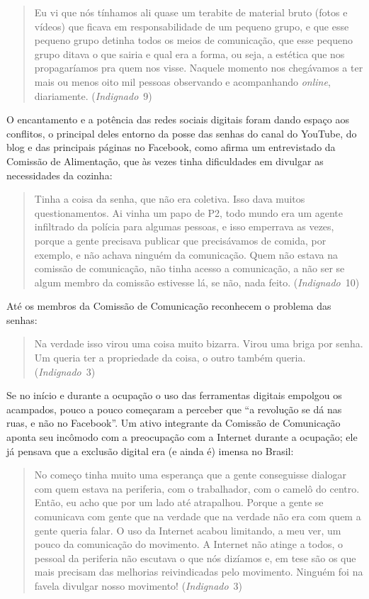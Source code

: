 \begin{quote}
Eu vi que nós tínhamos ali quase um terabite de material bruto
(fotos e vídeos) que ficava em responsabilidade de um pequeno
grupo, e que esse pequeno grupo detinha todos os meios de comunicação,
que esse pequeno grupo ditava o que sairia e qual era a forma, ou seja,
a estética que nos propagaríamos pra quem nos visse. Naquele momento nos
chegávamos a ter mais ou menos oito mil pessoas observando e
acompanhando \textit{online}, diariamente. (\textit{Indignado}~9)
\end{quote}

O encantamento e a potência das redes sociais digitais foram dando
espaço aos conflitos, o principal deles entorno da posse das senhas do
canal do YouTube, do blog e das principais páginas no Facebook, como
afirma um entrevistado da Comissão de Alimentação, que às vezes tinha
dificuldades em divulgar as necessidades da cozinha:

\begin{quote}
Tinha a coisa da senha, que não era coletiva. Isso dava muitos
questionamentos. Ai vinha um papo de P2, todo mundo era um agente
infiltrado da polícia para algumas pessoas, e isso emperrava as vezes,
porque a gente precisava publicar que precisávamos de comida, por
exemplo, e não achava ninguém da comunicação. Quem não estava na
comissão de comunicação, não tinha acesso a comunicação, a não ser se
algum membro da comissão estivesse lá, se não, nada feito. (\textit{Indignado}~10)
\end{quote}

Até os membros da Comissão de Comunicação reconhecem o problema das
senhas:

\begin{quote}
Na verdade isso virou uma coisa muito bizarra. Virou uma briga por
senha. Um queria ter a propriedade da coisa, o outro também queria.
(\textit{Indignado}~3)
\end{quote}

Se no início e durante a ocupação o uso das ferramentas digitais
empolgou os acampados, pouco a pouco começaram a perceber que ``a
revolução se dá nas ruas, e não no Facebook''. Um ativo integrante da
Comissão de Comunicação aponta seu incômodo com a preocupação com a
Internet durante a ocupação; ele já pensava que a exclusão digital era
(e ainda é) imensa no Brasil:

\begin{quote}
No começo tinha muito uma esperança que a gente conseguisse
dialogar com quem estava na periferia, com o trabalhador, com o camelô
do centro. Então, eu acho que por um lado até atrapalhou. Porque a gente
se comunicava com gente que na verdade que na verdade não era com quem a
gente queria falar. O uso da Internet acabou limitando, a meu ver, um
pouco da comunicação do movimento. A Internet não atinge a todos, o
pessoal da periferia não escutava o que nós dizíamos e, em tese são os
que mais precisam das melhorias reivindicadas pelo movimento. Ninguém
foi na favela divulgar nosso movimento! (\textit{Indignado}~3)
\end{quote}


